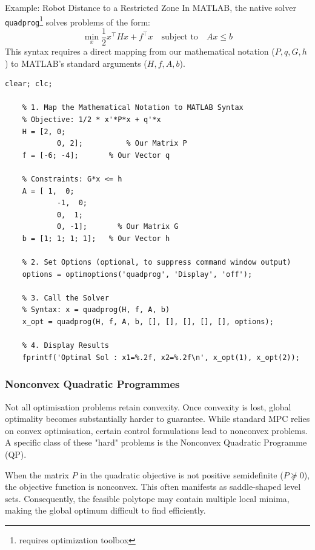 \begin{examplebox}{Example: Robot Distance to a Restricted Zone}
In MATLAB, the native solver \texttt{quadprog}\footnote{requires optimization toolbox} solves problems of the form:
\begin{equation*}
	\min_x \frac{1}{2}x^\top H x + f^\top x \quad \text{subject to} \quad A x \leq b
\end{equation*}
This syntax requires a direct mapping from our mathematical notation ($P, q, G, h$) to MATLAB's standard arguments ($H, f, A, b$).

\begin{lstlisting}[caption={Direct solution using MATLAB's built-in quadprog solver.}, label={lst:quadprog_direct}]
	clear; clc;
	
	% 1. Map the Mathematical Notation to MATLAB Syntax
	% Objective: 1/2 * x'*P*x + q'*x
	H = [2, 0; 
			0, 2];         	% Our Matrix P
	f = [-6; -4];       % Our Vector q
	
	% Constraints: G*x <= h
	A = [ 1,  0; 
			-1,  0; 
			0,  1; 
			0, -1];       % Our Matrix G
	b = [1; 1; 1; 1];   % Our Vector h
	
	% 2. Set Options (optional, to suppress command window output)
	options = optimoptions('quadprog', 'Display', 'off');
	
	% 3. Call the Solver
	% Syntax: x = quadprog(H, f, A, b)
	x_opt = quadprog(H, f, A, b, [], [], [], [], [], options);
	
	% 4. Display Results
	fprintf('Optimal Sol : x1=%.2f, x2=%.2f\n', x_opt(1), x_opt(2));
\end{lstlisting}
	
\end{examplebox}





\subsubsection{Nonconvex Quadratic Programmes}

Not all optimisation problems retain convexity. Once convexity is lost, global optimality becomes substantially harder to guarantee. While standard MPC relies on convex optimisation, certain control formulations lead to nonconvex problems. A specific class of these "hard" problems is the Nonconvex Quadratic Programme (QP).

When the matrix $P$ in the quadratic objective is not positive semidefinite ($P \not\succeq 0$), the objective function is nonconvex. This often manifests as saddle-shaped level sets. Consequently, the feasible polytope may contain multiple local minima, making the global optimum difficult to find efficiently.

